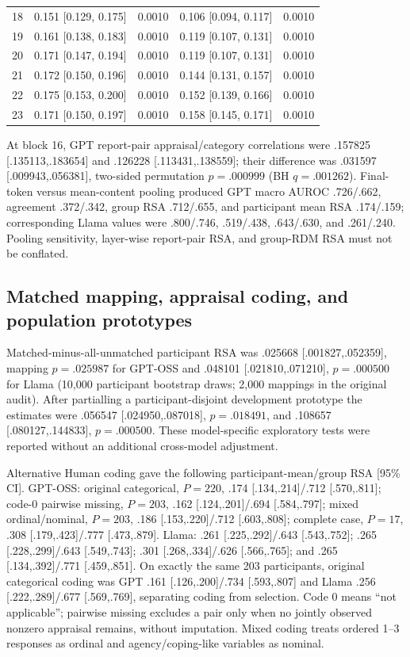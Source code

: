 \begin{table}[t]
{\begin{tabular}{rrrrr}
18 & 0.151 [0.129, 0.175] & 0.0010 & 0.106 [0.094, 0.117] & 0.0010 \\
19 & 0.161 [0.138, 0.183] & 0.0010 & 0.119 [0.107, 0.131] & 0.0010 \\
20 & 0.171 [0.147, 0.194] & 0.0010 & 0.119 [0.107, 0.131] & 0.0010 \\
21 & 0.172 [0.150, 0.196] & 0.0010 & 0.144 [0.131, 0.157] & 0.0010 \\
22 & 0.175 [0.153, 0.200] & 0.0010 & 0.152 [0.139, 0.166] & 0.0010 \\
23 & 0.171 [0.150, 0.197] & 0.0010 & 0.158 [0.145, 0.171] & 0.0010 \\
\bottomrule
\end{tabular}
}
\end{table}

At block 16, GPT report-pair appraisal/category correlations were .157825 [.135113,.183654] and .126228 [.113431,.138559]; their difference was .031597 [.009943,.056381], two-sided permutation $p=.000999$ (BH $q=.001262$). Final-token versus mean-content pooling produced GPT macro AUROC .726/.662, agreement .372/.342, group RSA .712/.655, and participant mean RSA .174/.159; corresponding Llama values were .800/.746, .519/.438, .643/.630, and .261/.240. Pooling sensitivity, layer-wise report-pair RSA, and group-RDM RSA must not be conflated.

\subsection{Matched mapping, appraisal coding, and population prototypes}
\label{app:mapping-coding}

Matched-minus-all-unmatched participant RSA was .025668 [.001827,.052359], mapping $p=.025987$ for GPT-OSS and .048101 [.021810,.071210], $p=.000500$ for Llama (10,000 participant bootstrap draws; 2,000 mappings in the original audit). After partialling a participant-disjoint development prototype the estimates were .056547 [.024950,.087018], $p=.018491$, and .108657 [.080127,.144833], $p=.000500$. These model-specific exploratory tests were reported without an additional cross-model adjustment.

Alternative Human coding gave the following participant-mean/group RSA [95\% CI]. GPT-OSS: original categorical, $P=220$, .174 [.134,.214]/.712 [.570,.811]; code-0 pairwise missing, $P=203$, .162 [.124,.201]/.694 [.584,.797]; mixed ordinal/nominal, $P=203$, .186 [.153,.220]/.712 [.603,.808]; complete case, $P=17$, .308 [.179,.423]/.777 [.473,.879]. Llama: .261 [.225,.292]/.643 [.543,.752]; .265 [.228,.299]/.643 [.549,.743]; .301 [.268,.334]/.626 [.566,.765]; and .265 [.134,.392]/.771 [.459,.851]. On exactly the same 203 participants, original categorical coding was GPT .161 [.126,.200]/.734 [.593,.807] and Llama .256 [.222,.289]/.677 [.569,.769], separating coding from selection. Code 0 means ``not applicable''; pairwise missing excludes a pair only when no jointly observed nonzero appraisal remains, without imputation. Mixed coding treats ordered 1--3 responses as ordinal and agency/coping-like variables as nominal.

